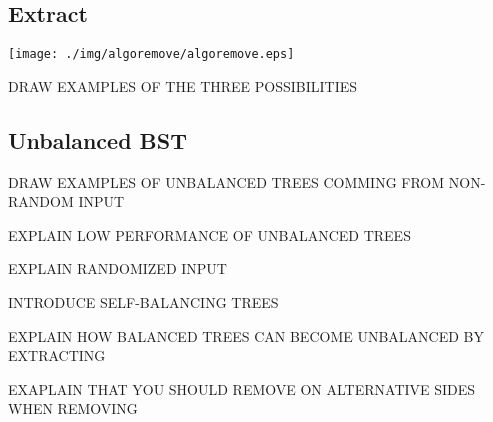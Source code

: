 \documentclass[a4paper, 9pt]{extarticle}
\begin{document}
\newpage

\subsection{Extract}

\begin{center}
  \texttt{[image: ./img/algoremove/algoremove.eps]}
\end{center}

DRAW EXAMPLES OF THE THREE POSSIBILITIES

\subsection{Unbalanced BST}

DRAW EXAMPLES OF UNBALANCED TREES COMMING FROM NON-RANDOM INPUT

EXPLAIN LOW PERFORMANCE OF UNBALANCED TREES

EXPLAIN RANDOMIZED INPUT

INTRODUCE SELF-BALANCING TREES

EXPLAIN HOW BALANCED TREES CAN BECOME UNBALANCED BY EXTRACTING

EXAPLAIN THAT YOU SHOULD REMOVE ON ALTERNATIVE SIDES WHEN REMOVING
\end{document}
